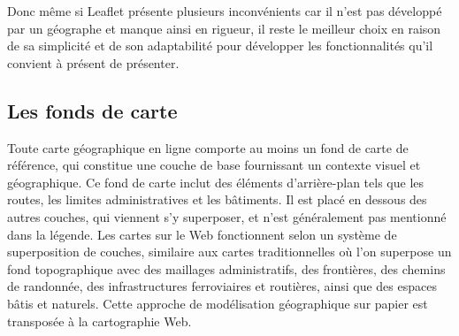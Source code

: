 Donc même si Leaflet présente plusieurs inconvénients car il n'est pas développé par un géographe et manque ainsi en rigueur, il reste le meilleur choix en raison de sa simplicité et de son adaptabilité pour développer les fonctionnalités qu'il convient à présent de présenter.  

\subsection{Les fonds de carte}
Toute carte géographique en ligne comporte au moins un fond de carte de référence, qui constitue une couche de base fournissant un contexte visuel et géographique. Ce fond de carte inclut des éléments d'arrière-plan tels que les routes, les limites administratives et les bâtiments. Il est placé en dessous des autres couches, qui viennent s'y superposer, et n'est généralement pas mentionné dans la légende. Les cartes sur le Web fonctionnent selon un système de superposition de couches, similaire aux cartes traditionnelles où l'on superpose un fond topographique avec des maillages administratifs, des frontières, des chemins de randonnée, des infrastructures ferroviaires et routières, ainsi que des espaces bâtis et naturels. Cette approche de modélisation géographique sur papier est transposée à la cartographie Web. 

